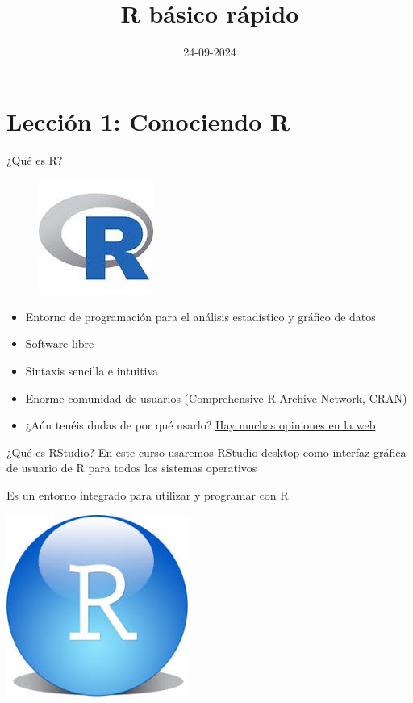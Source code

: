 \documentclass[
  ignorenonframetext,
  aspectratio=169]{beamer}
\title{R básico rápido}
\author{}
\date{\vspace{-2.5em}24-09-2024}
\providecommand{\tightlist}{%
  \setlength{\itemsep}{0pt}\setlength{\parskip}{0pt}}
\begin{document}
\frame{\titlepage}

\begin{frame}[allowframebreaks]
  \tableofcontents[hideallsubsections]
\end{frame}
\section{Lección 1: Conociendo R}\label{lecciuxf3n-1-conociendo-r}

\begin{frame}{¿Qué es R?}
\label{quuxe9-es-r}
\begin{figure}

{\centering \includegraphics[width=0.2\linewidth]{Imgs/Rlogo} 

}

\end{figure}

\begin{itemize}
\tightlist
\item
  Entorno de programación para el análisis estadístico y gráfico de
  datos
\item
  Software libre
\item
  Sintaxis sencilla e intuitiva
\item
  Enorme comunidad de usuarios (Comprehensive R Archive Network, CRAN)
\item
  ¿Aún tenéis dudas de por qué usarlo?
  \href{https://www.google.com/search?q=Why+use+R&rlz=1C1CHBF_esES891ES891&sxsrf=ALiCzsY4-woeo8PpPd0yw3j3b8guwp9zZQ\%3A1664188143209&ei=734xY5C1DOaIur4PjI2XoAU&ved=0ahUKEwjQ6PX4n7L6AhVmhM4BHYzGBVQQ4dUDCA4&uact=5&oq=Why+use+R&gs_lcp=Cgdnd3Mtd2l6EAMyCggAEEcQ1gQQsAMyCggAEEcQ1gQQsAMyCggAEEcQ1gQQsAMyCggAEEcQ1gQQsAMyCggAEEcQ1gQQsAMyCggAEEcQ1gQQsAMyCggAEEcQ1gQQsAMyCggAEEcQ1gQQsAMyBwgAELADEENKBAhBGABKBAhGGABQAFgAYIMMaAFwAHgAgAEAiAEAkgEAmAEAyAEJwAEB&sclient=gws-wiz}{Hay
  muchas opiniones en la web}
\end{itemize}
\end{frame}

\begin{frame}{¿Qué es RStudio?}
\label{quuxe9-es-rstudio}
En este curso usaremos RStudio-desktop como interfaz gráfica de usuario
de R para todos los sistemas operativos

Es un entorno integrado para utilizar y programar con R

\begin{center}\includegraphics[width=0.2\linewidth]{Imgs/RSLogo} \end{center}
\end{frame}
\end{document}
